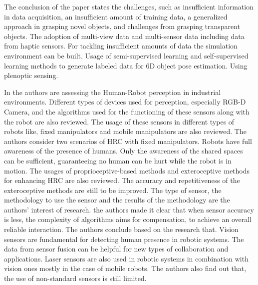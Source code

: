 {The conclusion of the paper states the challenges, such as insufficient information in data acquisition, an insufficient amount of training data, a generalized approach in grasping novel objects, and challenges from grasping transparent objects. The adoption of multi-view data and multi-sensor data including data from haptic sensors. For tackling insufficient amounts of data the simulation environment can be built. Usage of semi-supervised learning and self-supervised learning methods to generate labeled data for 6D object pose estimation. Using plenoptic sensing.

In \cite{author16} the authors are assessing the Human-Robot perception in industrial environments. Different types of devices used for perception, especially RGB-D Camera, and the algorithms used for the functioning of these sensors along with the robot are also reviewed. The usage of these sensors in different types of robots like, fixed manipulators and mobile manipulators are also reviewed. The authors consider two scenarios of HRC with fixed manipulators. Robots have full awareness of the presence of humans. Only the awareness of the shared spaces can be sufficient, guaranteeing no human can be hurt while the robot is in motion. The usages of proprioceptive-based methods and exteroceptive methods for enhancing HRC are also reviewed. The accuracy and repetitiveness of the exteroceptive methods are still to be improved. The type of sensor, the methodology to use the sensor and the results of the methodology are the authors' interest of research. the authors made it clear that when sensor accuracy is less, the complexity of algorithms aims for compensation, to achieve an overall reliable interaction. The authors conclude based on the research that. Vision sensors are fundamental for detecting human presence in robotic systems. The data from sensor fusion can be helpful for new types of collaboration and applications. Laser sensors are also used in robotic systems in combination with vision ones mostly in the case of mobile robots. The authors also find out that, the use of non-standard sensors is still limited. 

}
